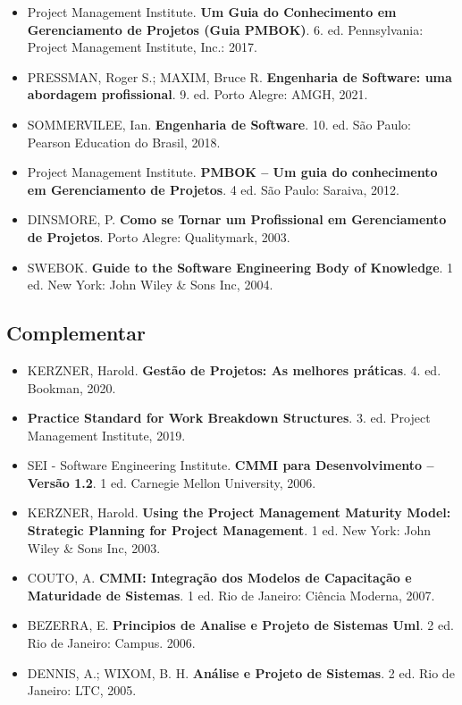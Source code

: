 \documentclass[a4paper, 12pt]{article}
\begin{document}
\begin{itemize}
    \item Project Management Institute. \textbf{Um Guia do Conhecimento em Gerenciamento de Projetos (Guia PMBOK)}. 6. ed. Pennsylvania: Project Management Institute, Inc.: 2017.
    \item PRESSMAN, Roger S.; MAXIM, Bruce R. \textbf{Engenharia de Software: uma abordagem profissional}. 9. ed. Porto Alegre: AMGH, 2021.
    \item SOMMERVILEE, Ian. \textbf{Engenharia de Software}. 10. ed. São Paulo: Pearson Education do Brasil, 2018.
    \item Project Management Institute. \textbf{PMBOK – Um guia do conhecimento em Gerenciamento de Projetos}. 4 ed. São Paulo: Saraiva, 2012.
    \item DINSMORE, P. \textbf{Como se Tornar um Profissional em Gerenciamento de Projetos}. Porto Alegre: Qualitymark, 2003.
    \item SWEBOK. \textbf{Guide to the Software Engineering Body of Knowledge}. 1 ed. New York: John Wiley \& Sons Inc, 2004.
\end{itemize}

\subsection{Complementar}

\begin{itemize}
    \item KERZNER, Harold. \textbf{Gestão de Projetos: As melhores práticas}. 4. ed. Bookman, 2020.
    \item \textbf{Practice Standard for Work Breakdown Structures}. 3. ed. Project Management Institute, 2019.
    \item SEI - Software Engineering Institute. \textbf{CMMI para Desenvolvimento – Versão 1.2}. 1 ed. Carnegie Mellon University, 2006.
    \item KERZNER, Harold. \textbf{Using the Project Management Maturity Model: Strategic Planning for Project Management}. 1 ed. New York: John Wiley \& Sons Inc, 2003.
    \item COUTO, A. \textbf{CMMI: Integração dos Modelos de Capacitação e Maturidade de Sistemas}. 1 ed. Rio de Janeiro: Ciência Moderna, 2007.
    \item BEZERRA, E. \textbf{Principios de Analise e Projeto de Sistemas Uml}. 2 ed. Rio de Janeiro: Campus. 2006.
    \item DENNIS, A.; WIXOM, B. H. \textbf{Análise e Projeto de Sistemas}. 2 ed. Rio de Janeiro: LTC, 2005.
\end{itemize}
\end{document}
